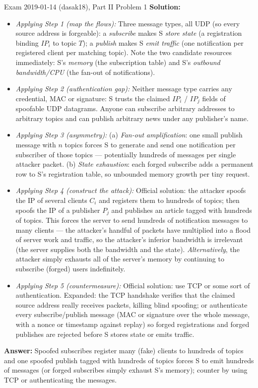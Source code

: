 \documentclass[12pt, a4paper]{article}
\begin{document}
\begin{practicebox}{Exam 2019-01-14 (dasak18), Part II Problem 1}
\textbf{Solution:}
\begin{itemize}
    \item \textit{Applying Step 1 (map the flows):} Three message types, all UDP (so every source address is forgeable): a \emph{subscribe} makes S \emph{store state} (a registration binding $IP_i$ to topic $T$); a \emph{publish} makes S \emph{emit traffic} (one notification per registered client per matching topic). Note the two candidate resources immediately: S's \emph{memory} (the subscription table) and S's \emph{outbound bandwidth/CPU} (the fan-out of notifications).
    \item \textit{Applying Step 2 (authentication gap):} Neither message type carries any credential, MAC or signature: S trusts the claimed $IP_i$ / $IP_j$ fields of spoofable UDP datagrams. Anyone can subscribe arbitrary addresses to arbitrary topics and can publish arbitrary news under any publisher's name.
    \item \textit{Applying Step 3 (asymmetry):} (a) \emph{Fan-out amplification}: one small publish message with $n$ topics forces S to generate and send one notification per subscriber of those topics --- potentially hundreds of messages per single attacker packet. (b) \emph{State exhaustion}: each forged subscribe adds a permanent row to S's registration table, so unbounded memory growth per tiny request.
    \item \textit{Applying Step 4 (construct the attack):} Official solution: the attacker spoofs the IP of several clients $C_i$ and registers them to hundreds of topics; then spoofs the IP of a publisher $P_j$ and publishes an article tagged with hundreds of topics. This forces the server to send hundreds of notification messages to many clients --- the attacker's handful of packets have multiplied into a flood of server work and traffic, so the attacker's inferior bandwidth is irrelevant (the server supplies both the bandwidth and the state). \emph{Alternatively}, the attacker simply exhausts all of the server's memory by continuing to subscribe (forged) users indefinitely.
    \item \textit{Applying Step 5 (countermeasure):} Official solution: use TCP or some sort of authentication. Expanded: the TCP handshake verifies that the claimed source address really receives packets, killing blind spoofing; or authenticate every subscribe/publish message (MAC or signature over the whole message, with a nonce or timestamp against replay) so forged registrations and forged publishes are rejected before S stores state or emits traffic.
\end{itemize}
\textbf{Answer:} Spoofed subscribes register many (fake) clients to hundreds of topics and one spoofed publish tagged with hundreds of topics forces S to emit hundreds of messages (or forged subscribes simply exhaust S's memory); counter by using TCP or authenticating the messages.
\end{practicebox}
\end{document}
